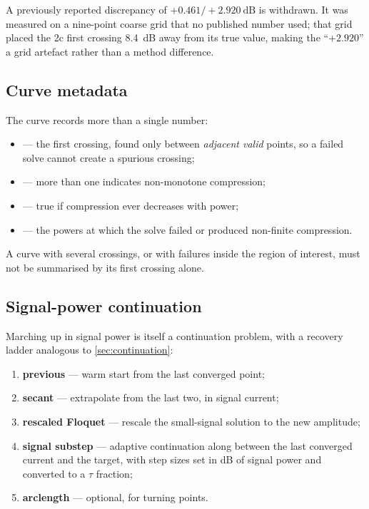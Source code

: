 \begin{remark}
A previously reported discrepancy of $+0.461/+\SI{2.920}{\dB}$ is withdrawn. It
was measured on a nine-point coarse grid that no published number used; that
grid placed the 2c first crossing \SI{8.4}{\dB} away from its true value, making
the ``$+2.920$'' a grid artefact rather than a method difference.
\end{remark}

\subsection{Curve metadata}

\begin{implnote}
The curve records more than a single number:
\begin{itemize}
\item {} --- the first crossing, found only
      between \emph{adjacent valid} points, so a failed solve cannot create a
      spurious crossing;
\item {} --- more than one indicates non-monotone
      compression;
\item {} --- true if compression ever decreases
      with power;
\item {} --- the powers at which the solve failed
      or produced non-finite compression.
\end{itemize}
A curve with several crossings, or with failures inside the region of interest,
must not be summarised by its first crossing alone.
\end{implnote}

\subsection{Signal-power continuation}
\label{sec:signal-substep}

Marching up in signal power is itself a continuation problem, with a recovery
ladder analogous to \cref{sec:continuation}:

\begin{enumerate}
\item \textbf{previous} --- warm start from the last converged point;
\item \textbf{secant} --- extrapolate from the last two, in signal current;
\item \textbf{rescaled Floquet} --- rescale the small-signal solution to the new
      amplitude;
\item \textbf{signal substep} --- adaptive continuation along
       between the last converged current and the target,
      with step sizes set in \si{\dB} of signal power and converted to a
      $\tau$ fraction;
\item \textbf{arclength} --- optional, for turning points.
\end{enumerate}

